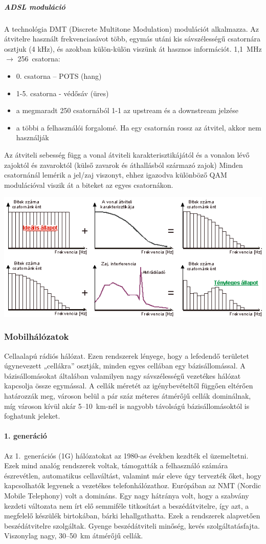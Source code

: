\subparagraph{ADSL moduláció} A technológia DMT (Discrete Multitone Modulation) modulációt alkalmazza. Az átvitelre használt frekvenciasávot több, egymás utáni kis sávszélességű csatornára osztjuk (4 kHz), és azokban külön-külön viszünk át hasznos információt. 1,1~MHz $\rightarrow$ 256~csatorna:
\begin{itemize}[nosep]
	\item 0. csatorna -- POTS (hang)
	\item 1-5. csatorna - védősáv (üres)
	\item a megmaradt 250 csatornából 1-1 az upstream és a downstream jelzése
	\item a többi a felhasználói forgalomé. Ha egy csatornán rossz az átvitel, akkor nem használják
\end{itemize}
Az átviteli sebesség függ a vonal átviteli karakterisztikájától és a vonalon lévő zajoktól és zavaroktól (külső zavarok és áthallásból származó zajok)
Minden csatornánál lemérik a jel/zaj viszonyt, ehhez igazodva különböző QAM modulációval viszik át a biteket az egyes csatornákon.
\begin{center}
	\includegraphics[width=0.7\linewidth]{fig/12-DMT}
\end{center}
\subsubsection{Mobilhálózatok}
Cellaalapú rádiós hálózat. Ezen rendszerek lényege, hogy a lefedendő területet úgynevezett „cellákra” osztják, minden egyes cellában egy bázisállomással. A bázisállomásokat általában valamilyen nagy sávszélességű vezetékes hálózat kapcsolja össze egymással. A cellák méretét az igénybevételtől függően eltérően határozzák meg, városon belül a pár száz méteres átmérőjű cellák dominálnak, míg városon kívül akár 5--10~km-nél is nagyobb távolságú bázisállomásoktól is foghatunk jeleket.

\paragraph{1. generáció}
Az 1.~generációs (1G) hálózatokat az 1980-as években kezdték el üzemeltetni. Ezek mind analóg rendszerek voltak, támogatták a felhasználó számára észrevétlen, automatikus cellaváltást, valamint már eleve úgy tervezték őket, hogy kapcsolhatók legyenek a vezetékes telefonhálózathoz. Európában az NMT (Nordic Mobile Telephony) volt a domináns. Egy nagy hátránya volt, hogy a szabvány kezdeti változata nem írt elő semmiféle titkosítást a beszédátvitelre, így azt, a megfelelő készülék birtokában, bárki lehallgathatta. Ezek a rendszerek alapvetően beszédátvitelre szolgáltak. Gyenge beszédátviteli minőség, kevés szolgáltatásfajta. Viszonylag nagy, 30--50~km átmérőjű cellák.

